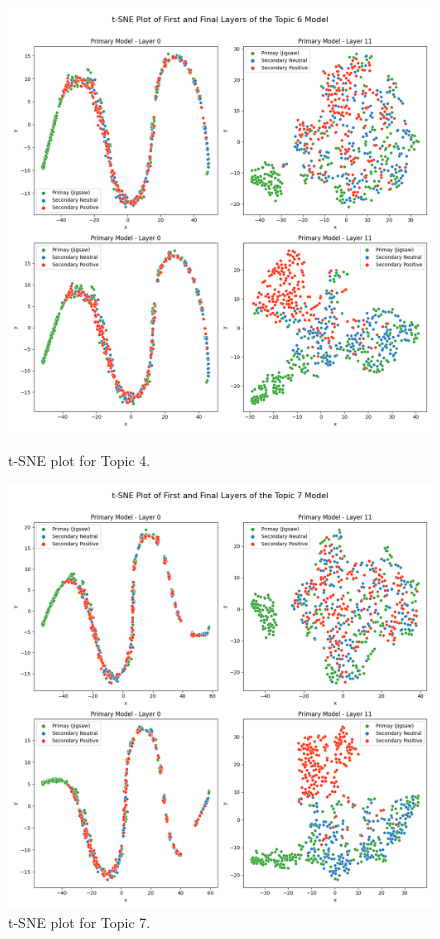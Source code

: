 \begin{figure}[ht]
    \centering

    \begin{minipage}{0.49\textwidth}
        \centering
        \includegraphics[width=\linewidth]{graphs/tsne/combined_6.png}
        \caption{t-SNE plot for Topic 4.}
        \label{sub:topic6}
    \end{minipage}
    \hfill
    \begin{minipage}{0.49\textwidth}
        \centering
        \includegraphics[width=\linewidth]{graphs/tsne/combined_7.png}
        \caption{t-SNE plot for Topic 7.}
        \label{sub:topic7}
    \end{minipage}


\end{figure}

